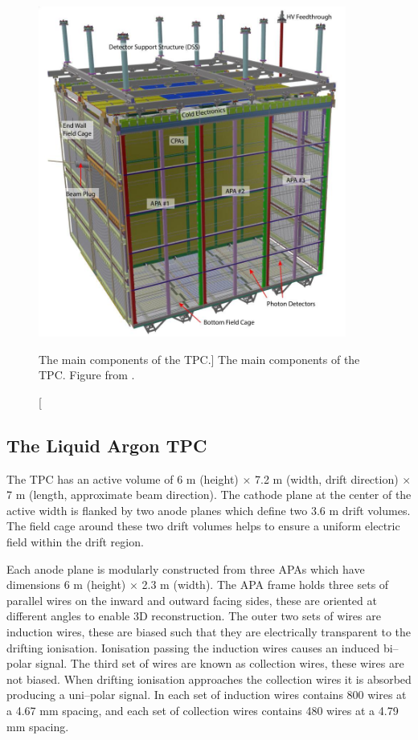 \begin{figure}

	\centering

	\includegraphics[width=0.9\textwidth]{figures/pdsp_tpc.jpg}

	\caption
	[The main components of the \protodune{} TPC.]
	{The main components of the \protodune{} TPC. Figure from \cite{Abi2017}.}

	\label{fig:pdsp_tpc}

\end{figure}

\subsection{The Liquid Argon TPC}

The \protodune{} TPC has an active volume of 6 m (height) $\times$ 7.2 m (width,
drift direction) $\times$ 7 m (length, approximate beam direction). The cathode 
plane at the center of the active width is flanked by two anode planes which 
define two 3.6 m drift volumes. The field cage around these two drift volumes
helps to ensure a uniform electric field within the drift region.

Each anode plane is modularly constructed from three APAs which have dimensions
6 m (height) $\times$ 2.3 m (width). The APA frame holds three sets of parallel
wires on the inward and outward facing sides, these are oriented at different 
angles to enable 3D reconstruction. The outer two sets of wires are induction
wires, these are biased such that they are electrically transparent to the 
drifting ionisation. Ionisation passing the induction wires causes an induced 
bi--polar signal. The third set of wires are known as collection wires, these
wires are not biased. When drifting ionisation approaches the collection wires 
it is absorbed producing a uni--polar signal. In \protodune{} each set of 
induction wires contains 800 wires at a 4.67 mm spacing, and each set of 
collection wires contains 480 wires at a 4.79 mm spacing. 

